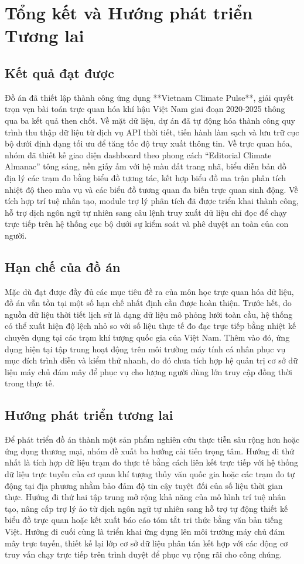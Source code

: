 \chapter{Tổng kết và Hướng phát triển Tương lai}

\section{Kết quả đạt được}
Đồ án đã thiết lập thành công ứng dụng **Vietnam Climate Pulse**, giải quyết trọn vẹn bài toán trực quan hóa khí hậu Việt Nam giai đoạn 2020-2025 thông qua ba kết quả then chốt. Về mặt dữ liệu, dự án đã tự động hóa thành công quy trình thu thập dữ liệu từ dịch vụ API thời tiết, tiến hành làm sạch và lưu trữ cục bộ dưới định dạng tối ưu để tăng tốc độ truy xuất thông tin. Về trực quan hóa, nhóm đã thiết kế giao diện dashboard theo phong cách ``Editorial Climate Almanac'' tông sáng, nền giấy ấm với hệ màu đất trang nhã, biểu diễn bản đồ địa lý các trạm đo bằng biểu đồ tương tác, kết hợp biểu đồ ma trận phân tích nhiệt độ theo mùa vụ và các biểu đồ tương quan đa biến trực quan sinh động. Về tích hợp trí tuệ nhân tạo, module trợ lý phân tích đã được triển khai thành công, hỗ trợ dịch ngôn ngữ tự nhiên sang câu lệnh truy xuất dữ liệu chỉ đọc để chạy trực tiếp trên hệ thống cục bộ dưới sự kiểm soát và phê duyệt an toàn của con người.

\section{Hạn chế của đồ án}
Mặc dù đạt được đầy đủ các mục tiêu đề ra của môn học trực quan hóa dữ liệu, đồ án vẫn tồn tại một số hạn chế nhất định cần được hoàn thiện. Trước hết, do nguồn dữ liệu thời tiết lịch sử là dạng dữ liệu mô phỏng lưới toàn cầu, hệ thống có thể xuất hiện độ lệch nhỏ so với số liệu thực tế đo đạc trực tiếp bằng nhiệt kế chuyên dụng tại các trạm khí tượng quốc gia của Việt Nam. Thêm vào đó, ứng dụng hiện tại tập trung hoạt động trên môi trường máy tính cá nhân phục vụ mục đích trình diễn và kiểm thử nhanh, do đó chưa tích hợp hệ quản trị cơ sở dữ liệu máy chủ đám mây để phục vụ cho lượng người dùng lớn truy cập đồng thời trong thực tế.

\section{Hướng phát triển tương lai}
Để phát triển đồ án thành một sản phẩm nghiên cứu thực tiễn sâu rộng hơn hoặc ứng dụng thương mại, nhóm đề xuất ba hướng cải tiến trọng tâm. Hướng đi thứ nhất là tích hợp dữ liệu trạm đo thực tế bằng cách liên kết trực tiếp với hệ thống dữ liệu trực tuyến của cơ quan khí tượng thủy văn quốc gia hoặc các trạm đo tự động tại địa phương nhằm bảo đảm độ tin cậy tuyệt đối của số liệu thời gian thực. Hướng đi thứ hai tập trung mở rộng khả năng của mô hình trí tuệ nhân tạo, nâng cấp trợ lý ảo từ dịch ngôn ngữ tự nhiên sang hỗ trợ tự động thiết kế biểu đồ trực quan hoặc kết xuất báo cáo tóm tắt tri thức bằng văn bản tiếng Việt. Hướng đi cuối cùng là triển khai ứng dụng lên môi trường máy chủ đám mây trực tuyến, thiết kế lại lớp cơ sở dữ liệu phân tán kết hợp với các động cơ truy vấn chạy trực tiếp trên trình duyệt để phục vụ rộng rãi cho công chúng.

